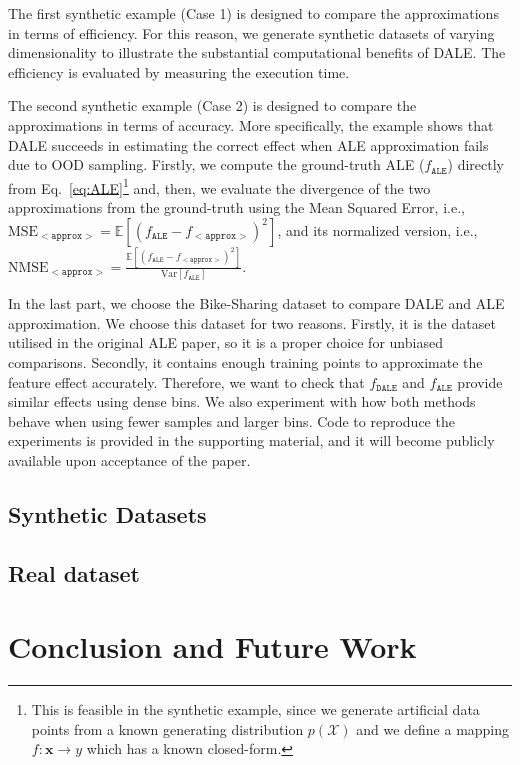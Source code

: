 \documentclass[wcp]{jmlr}
\newcommand{\ale}{f_{\mathtt{ALE}}}
\newcommand{\xb}{\mathbf{x}} \newcommand{\R}{\mathbb{R}}
\newcommand{\E}{\mathbb{E}} \newcommand{\Jac}{\mathbf{J}}
\begin{document}
The first synthetic example (Case 1) is designed to compare the
approximations in terms of efficiency. For this reason, we generate
synthetic datasets of varying dimensionality to illustrate the
substantial computational benefits of DALE. The efficiency is
evaluated by measuring the execution time.

The second synthetic example (Case 2) is designed to compare the
approximations in terms of accuracy. More specifically, the example
shows that DALE succeeds in estimating the correct effect when ALE
approximation fails due to OOD sampling. Firstly, we compute the
ground-truth ALE (\(f_{\mathtt{ALE}}\)) directly from
Eq.~\eqref{eq:ALE}\footnote{This is feasible in the synthetic example,
  since we generate artificial data points from a known generating
  distribution \(p(\mathcal{X}) \) and we define a mapping
  \( f: \xb \rightarrow y \) which has a known closed-form.} and,
then, we evaluate the divergence of the two approximations from the
ground-truth using the Mean Squared Error, i.e.,
\(\text{MSE}_{\mathtt{<approx>}} = \E[(\ale -
f_{\mathtt{<approx>}})^2] \), and its normalized version, i.e.,
\(\text{NMSE}_{\mathtt{<approx>}} = \frac{\E[(\ale -
  f_{\mathtt{<approx>}})^2]}{\text{Var}[\ale]}\).

In the last part, we choose the Bike-Sharing dataset to compare DALE
and ALE approximation. We choose this dataset for two
reasons. Firstly, it is the dataset utilised in the original ALE
paper, so it is a proper choice for unbiased comparisons. Secondly, it
contains enough training points to approximate the feature effect
accurately. Therefore, we want to check that \(f_{\mathtt{DALE}}\) and
\(\hat{f}_{\mathtt{ALE}}\) provide similar effects using dense
bins. We also experiment with how both methods behave when using fewer
samples and larger bins. Code to reproduce the experiments is provided
in the supporting material, and it will become publicly available upon
acceptance of the paper.

\subsection{Synthetic Datasets}

\label{sec:5-1-artificial-experiments}

\subsection{Real dataset}

\label{sec:5-2-real-datasets}

\section{Conclusion and Future Work}




%


\end{document}
